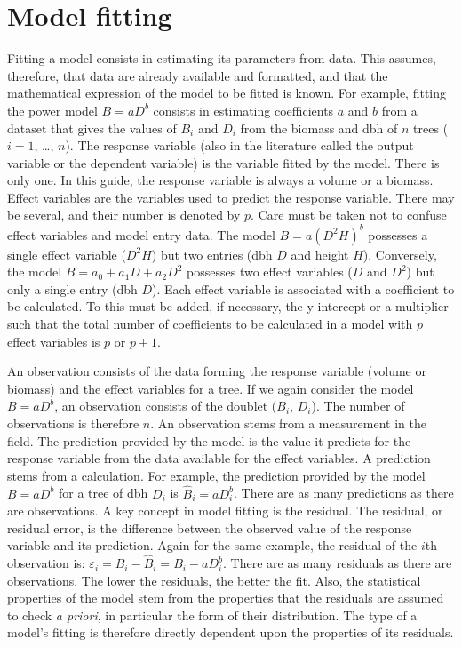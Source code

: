 \chapter{Model fitting\label{fit}}

Fitting a model consists in estimating its parameters from data. This assumes, therefore, that data are already available and formatted, and that the mathematical expression of the model to be fitted is known. For example, fitting the power model $B=aD^b$ consists in estimating coefficients $a$ and $b$ from a dataset that gives the values of 
$B_i$ and $D_i$ from the biomass and dbh of $n$ trees ($i=1$, \ldots, $n$). 
The response variable (also in the literature called the output variable or the dependent variable) is the variable fitted by the model. There is only one. In this guide, the response variable is always a volume or a biomass. Effect variables are the variables used to predict the response variable. There may be several, and their number is denoted by $p$. Care must be taken not to confuse effect variables and model entry data. The model $B=a(D^2H)^b$ possesses a single effect variable ($D^2H$) but two entries (dbh $D$ and height $H$). Conversely, the model $B=a_0+a_1D+a_2D^2$ possesses two effect variables ($D$ and $D^2$) but only a single entry (dbh $D$). Each effect variable is associated with a coefficient to be calculated. To this must be added, if necessary, the y-intercept or a multiplier such that the total number of coefficients to be calculated in a model with $p$ effect variables is $p$ or $p+1$.

An observation consists of the data forming the response variable (volume or biomass) and the effect variables for a tree. If we again consider the model $B=aD^b$, an observation consists of the doublet ($B_i$, $D_i$). The number of observations is therefore $n$. An observation stems from a measurement in the field. The prediction provided by the model is the value it predicts for the response variable from the data available for the effect variables. A prediction stems from a calculation. For example, the prediction provided by the model $B=aD^b$ for a tree of dbh $D_i$ is
$\hat{B}_i=aD_i^b$. There are as many predictions as there are observations. A key concept in model fitting is the residual. The residual, or residual error, is the difference between the observed value of the response variable and its prediction. Again for the same example, the residual of the $i$th observation is: $\varepsilon_i=B_i-\hat{B}_i=B_i-aD_i^b$. There are as many residuals as there are observations. The lower the residuals, the better the fit. Also, the statistical properties of the model stem from the properties that the residuals are assumed to check \textit{a priori}, in particular the form of their distribution. The type of a model's fitting is therefore directly dependent upon the properties of its residuals.

